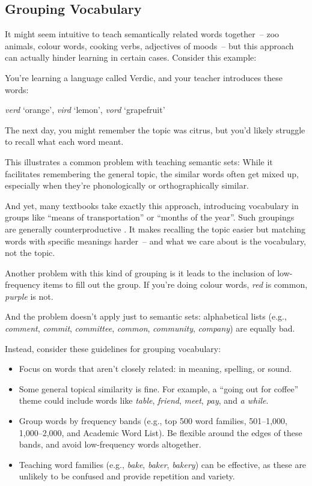 \subsection{Grouping Vocabulary}

It might seem intuitive to teach semantically related words together~-- zoo animals, colour words, cooking verbs, adjectives of moods~-- but this approach can actually hinder learning in certain cases. Consider this example: 

You're learning a language called Verdic, and your teacher introduces these words:

\ea \textit{verd} `orange', \textit{vird} `lemon', \textit{vord} `grapefruit'
\z

\noindent The next day, you might remember the topic was citrus, but you'd likely struggle to recall what each word meant.

This illustrates a common problem with teaching semantic sets: While it facilitates remembering the general topic, the similar words often get mixed up, especially when they're phonologically or orthographically similar.

And yet, many textbooks take exactly this approach, introducing vocabulary in groups like ``means of transportation'' or ``months of the year''. Such groupings are generally counterproductive \citep{finkbeiner2003semantic, higa1963interference, schurgin2020psychophysical, waring1997negative}. It makes recalling the topic easier but matching words with specific meanings harder~-- and what we care about is the vocabulary, not the topic.

Another problem with this kind of grouping is it leads to the inclusion of low-frequency items to fill out the group. If you're doing colour words, \textit{red} is common, \textit{purple} is not.

And the problem doesn't apply just to semantic sets: alphabetical lists (e.g., \textit{comment},\textit{ commit},\textit{ committee},\textit{ common},\textit{ community},\textit{ company}) are equally bad.

Instead, consider these guidelines for grouping vocabulary:

\begin{itemize}
    \item Focus on words that aren't closely related: in meaning, spelling, or sound.
    \item Some general topical similarity is fine. For example, a ``going out for coffee'' theme could include words like \textit{table}, \textit{friend}, \textit{meet}, \textit{pay}, and \textit{a while}.
    \item Group words by frequency bands (e.g., top 500 word families, 501--1,000, 1,000--2,000, and Academic Word List). Be flexible around the edges of these bands, and avoid low-frequency words altogether.
    \item Teaching word families (e.g., \textit{bake}, \textit{baker}, \textit{bakery}) can be effective, as these are unlikely to be confused and provide repetition and variety.
\end{itemize}

